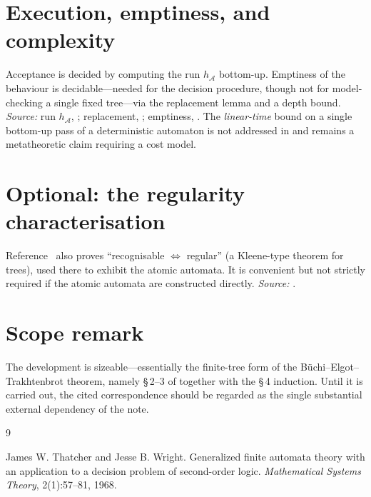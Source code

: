\documentclass[11pt]{article}
\begin{document}
\section{Execution, emptiness, and complexity}
Acceptance is decided by computing the run \(h_{\mathcal A}\) bottom-up.  Emptiness
of the behaviour is decidable---needed for the decision procedure, though not for
model-checking a single fixed tree---via the replacement lemma and a depth bound.
\hfill\emph{Source:} run \(h_{\mathcal A}\), \cite[\S\,2, pp.~60--61]{TW};
replacement, \cite[Lemma~5, p.~65; Lemma~6, p.~65]{TW}; emptiness,
\cite[Theorem~7, pp.~65--66]{TW}.  The \emph{linear-time} bound on a single
bottom-up pass of a deterministic automaton is not addressed in \cite{TW} and
remains a metatheoretic claim requiring a cost model.

\section{Optional: the regularity characterisation}
Reference~\cite{TW} also proves ``recognisable \(\Leftrightarrow\) regular'' (a
Kleene-type theorem for trees), used there to exhibit the atomic automata.  It is
convenient but not strictly required if the atomic automata are constructed
directly.
\hfill\emph{Source:} \cite[Theorem~8, pp.~66--67; Theorem~9, pp.~67--69;
Lemmas~10--13, pp.~69--72]{TW}.

\section{Scope remark}
The development is sizeable---essentially the finite-tree form of the
B\"uchi--Elgot--Trakhtenbrot theorem, namely \S\,2--3 of \cite{TW} together with
the \S\,4 induction.  Until it is carried out, the cited correspondence should be
regarded as the single substantial external dependency of the note.

\begin{thebibliography}{9}

James W. Thatcher and Jesse B. Wright.
\newblock Generalized finite automata theory with an application to a decision
problem of second-order logic.
\newblock \emph{Mathematical Systems Theory}, 2(1):57--81, 1968.

\end{thebibliography}
\end{document}
